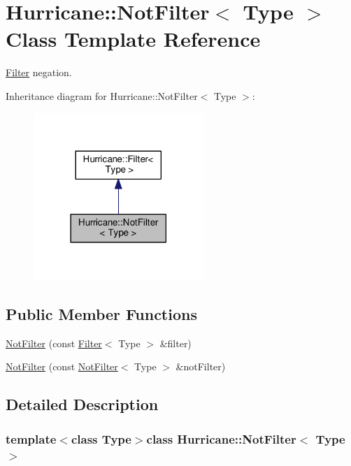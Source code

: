 \hypertarget{classHurricane_1_1NotFilter}{\section{Hurricane\-:\-:Not\-Filter$<$ Type $>$ Class Template Reference}
\label{classHurricane_1_1NotFilter}
}


\hyperlink{classHurricane_1_1Filter}{Filter} negation.  




Inheritance diagram for Hurricane\-:\-:Not\-Filter$<$ Type $>$\-:\nopagebreak
\begin{figure}[H]
\begin{center}
\leavevmode
\includegraphics[width=182pt]{classHurricane_1_1NotFilter__inherit__graph}
\end{center}
\end{figure}
\subsection*{Public Member Functions}
\begin{DoxyCompactItemize}
\item 
\hyperlink{classHurricane_1_1NotFilter_a8c75f2e192929c1b559f4ca876e47126}{Not\-Filter} (const \hyperlink{classHurricane_1_1Filter}{Filter}$<$ Type $>$ \&filter)
\item 
\hyperlink{classHurricane_1_1NotFilter_a232102dc584111a704e66b2ac793af86}{Not\-Filter} (const \hyperlink{classHurricane_1_1NotFilter}{Not\-Filter}$<$ Type $>$ \&not\-Filter)
\end{DoxyCompactItemize}


\subsection{Detailed Description}
\subsubsection*{template$<$class Type$>$class Hurricane\-::\-Not\-Filter$<$ Type $>$}

